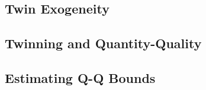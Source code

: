 \subsection{Twin Exogeneity}


\subsection{Twinning and Quantity-Quality}


\subsection{Estimating Q-Q Bounds}

